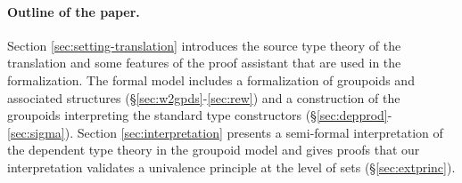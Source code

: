 
\paragraph{\bf Outline of the paper.}
Section \ref{sec:setting-translation} introduces the source type
theory of the translation and some features of the proof assistant
that are used in the formalization. The formal model includes a
formalization of groupoids and associated structures
(\S\ref{sec:w2gpds}-\ref{sec:rew}) and a construction of the groupoids
interpreting the standard type constructors
(\S\ref{sec:depprod}-\ref{sec:sigma}). Section
\ref{sec:interpretation} presents a semi-formal interpretation of the
dependent type theory in the groupoid model and gives proofs that our
interpretation validates a univalence principle at the level of sets
(\S\ref{sec:extprinc}).
%

